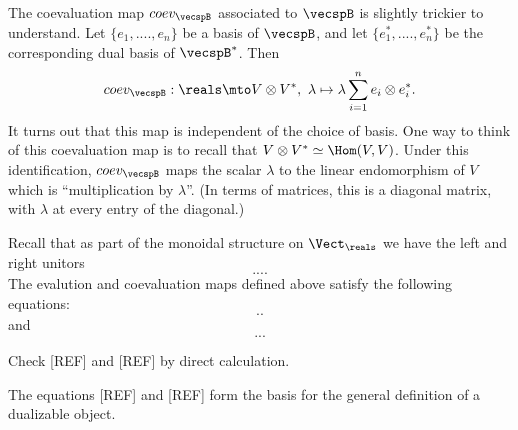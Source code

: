 The coevaluation map $coev_\vecspB$ associated to $\vecspB$ is slightly trickier to understand. Let $\{e_1, ...., e_n \}$ be a basis of $\vecspB$, and let $\{e_1^*, ...., e_n^* \}$ be the corresponding dual basis of $\vecspB^*$. Then
\begin{equation}
coev_\vecspB : \reals \mto V \otimes V^*, \ \lambda \mapsto \lambda \sum_{i=1}^n e_i \otimes e_i^*.
\end{equation}
It turns out that this map is independent of the choice of basis. One way to think of this coevaluation map is to recall that $V \otimes V^* \simeq \Hom(V, V)$. Under this identification, $coev_\vecspB$ maps the scalar $\lambda$ to the linear endomorphism of $V$ which is ``multiplication by $\lambda$''. (In terms of matrices, this is a diagonal matrix, with $\lambda$ at every entry of the diagonal.)
 
Recall that as part of the monoidal structure on $\Vect_\reals$ we have the left and right unitors
\begin{equation}
....
\end{equation}
The evalution and coevaluation maps defined above satisfy the following equations:
\begin{equation}
..
\end{equation}
and
\begin{equation}
...
\end{equation}

\begin{gradedexercise}
Check [REF] and [REF] by direct calculation. 
\end{gradedexercise}

The equations [REF] and [REF] form the basis for the general definition of a dualizable object. 

